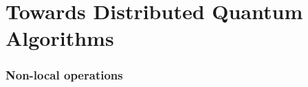\chapter{Towards Distributed Quantum Algorithms}
\label{Project}

\subsection{Non-local operations}
\label{NonLocalGates}